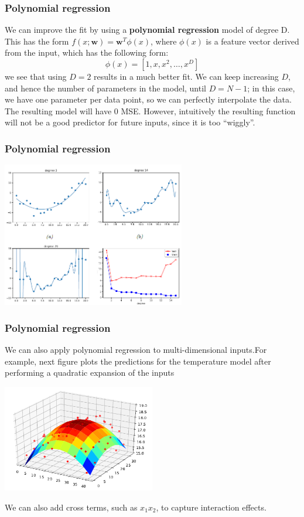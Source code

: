 \documentclass[spanish]{beamer}
\begin{document}
\begin{frame}
\frametitle{Polynomial regression}
We can improve the fit by using a \textbf{polynomial regression} model of degree D. This has the form $f(x;\boldsymbol{w}) = \boldsymbol{w}^T \phi(x)$, where $\phi(x)$ is a feature vector derived from the input, which has the following form:
\begin{equation*}
 \phi(x)=[1,x,x^2,\ldots,x^D]
\end{equation*}
we see that using $D = 2$ results in a much better fit. We can keep increasing $D$, and
hence the number of parameters in the model, until $D = N-1$; in this case, we have one parameter per data point, so we can perfectly interpolate the data. The resulting model will have 0 MSE. However, intuitively the resulting function will not be a good predictor for future
inputs, since it is too “wiggly”.
\end{frame}
\begin{frame}
\frametitle{Polynomial regression}

\begin{center}
\includegraphics[width=0.6\textwidth]{im12}
\end{center}

\end{frame}
\begin{frame}
\frametitle{Polynomial regression}
We can also apply polynomial regression to multi-dimensional inputs.For example, next figure plots the predictions for the temperature model after performing a quadratic expansion of the inputs
\begin{center}
\includegraphics[width=0.5\textwidth]{im13}
\end{center}
We can also add cross terms, such as $x_1 x_2$, to capture
interaction effects.
\end{frame}
\end{document}
